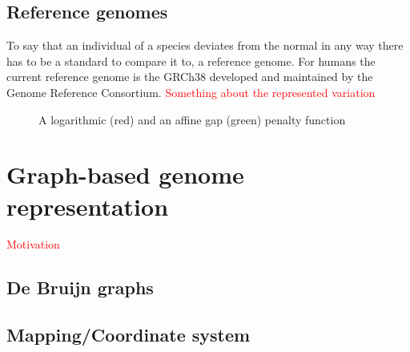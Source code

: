 \documentclass[thesis.tex]{subfiles}
\begin{document}
\subsection{Reference genomes}
To say that an individual of a species deviates from the normal in any way there has to be a standard to compare it to, a reference genome. For humans the current reference genome is the GRCh38 developed and maintained by the Genome Reference Consortium. \textcolor{red}{Something about the represented variation}
\begin{figure}
	\begin{center}
	\end{center}
	\caption{A logarithmic (red) and an affine gap (green) penalty function}
	\label{fig:GapPenalties}
\end{figure}
\section{Graph-based genome representation}
\textcolor{red}{Motivation}
\subsection{De Bruijn graphs}
\subsection{Mapping/Coordinate system}
\end{document}
